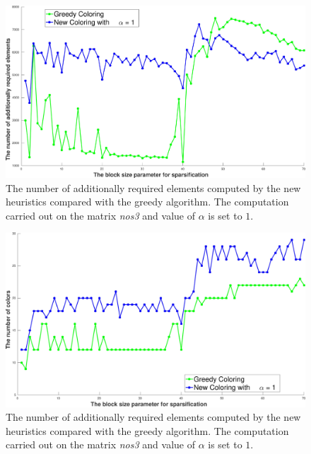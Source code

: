 \documentclass[12pt, twoside]{book}
\begin{document}
\begin{figure}
\centering
\includegraphics[width=0.9\linewidth]{bls_add_alpha_1_nos3}
\caption{The number of additionally required elements computed
by the new heuristics compared with the
greedy algorithm. The computation carried out on the matrix
\textit{nos3} and value of $\alpha$ is
set to $1$.}
\label{new.col.add.alpha.one.nos3}
\end{figure}
\begin{figure}
\centering
\includegraphics[width=0.9\linewidth]{bls_col_alpha_1_nos3}
\caption{The number of additionally required elements computed
by the new heuristics compared with the greedy algorithm.
The computation carried out on the matrix \textit{nos3}
and value of $\alpha$ is set to $1$.}
\label{new.col.col.alpha.one.nos3}
\end{figure}
\end{document}

